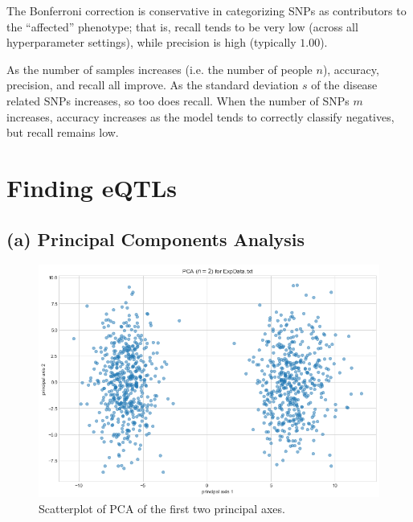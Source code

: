 \documentclass{article}[11pt]
\begin{document}
The Bonferroni correction is conservative in categorizing
SNPs as contributors to the ``affected'' phenotype; that
is, recall tends to be very low (across all hyperparameter
settings), while precision is high (typically $1.00$).

As the number of samples increases (i.e. the number of people $n$),
accuracy, precision, and recall all improve. As the standard
deviation $s$ of the disease related SNPs increases, so too does
recall. When the number of SNPs $m$ increases, accuracy increases
as the model tends to correctly classify negatives, but recall
remains low.

\section{Finding eQTLs}

\subsection*{(a) Principal Components Analysis}
\begin{figure}[H]
\includegraphics[width=\textwidth]{./imgs/pca.png}
\caption{Scatterplot of PCA of the first two principal axes.}
\end{figure}
\end{document}
